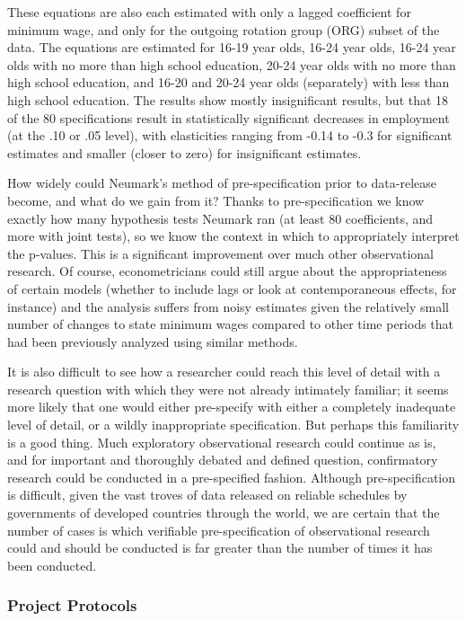 \documentclass[12pt] {article}
\begin{document}
These equations are also each estimated with only a lagged coefficient for minimum wage, and only for the outgoing rotation group (ORG) subset of the data. The equations are estimated for 16-19 year olds, 16-24 year olds, 16-24 year olds with no more than high school education, 20-24 year olds with no more than high school education, and 16-20 and 20-24 year olds (separately) with less than high school education. The results show mostly insignificant results, but that 18 of the 80 specifications result in statistically significant decreases in employment (at the .10 or .05 level), with elasticities ranging from -0.14 to -0.3 for significant estimates and smaller (closer to zero) for insignificant estimates. 

How widely could Neumark's method of pre-specification prior to data-release become, and what do we gain from it? Thanks to pre-specification we know exactly how many hypothesis tests Neumark ran (at least 80 coefficients, and more with joint tests), so we know the context in which to appropriately interpret the p-values. This is a significant improvement over much other observational research. Of course, econometricians could still argue about the appropriateness of certain models (whether to include lags or look at contemporaneous effects, for instance) and the analysis suffers from noisy estimates given the relatively small number of changes to state minimum wages compared to other time periods that had been previously analyzed using similar methods.  

It is also difficult to see how a researcher could reach this level of detail with a research question with which they were not already intimately familiar; it seems more likely that one would either pre-specify with either a completely inadequate level of detail, or a wildly inappropriate specification. But perhaps this familiarity is a good thing. Much exploratory observational research could continue as is, and for important and thoroughly debated and defined question, confirmatory research could be conducted in a pre-specified fashion. Although pre-specification is difficult, given the vast troves of data released on reliable schedules by governments of developed countries through the world, we are certain that the number of cases is which verifiable pre-specification of observational research could and should be conducted is far greater than the number of times it has been conducted.

\subsubsection{Project Protocols}\label{project-protocols}
\end{document}
